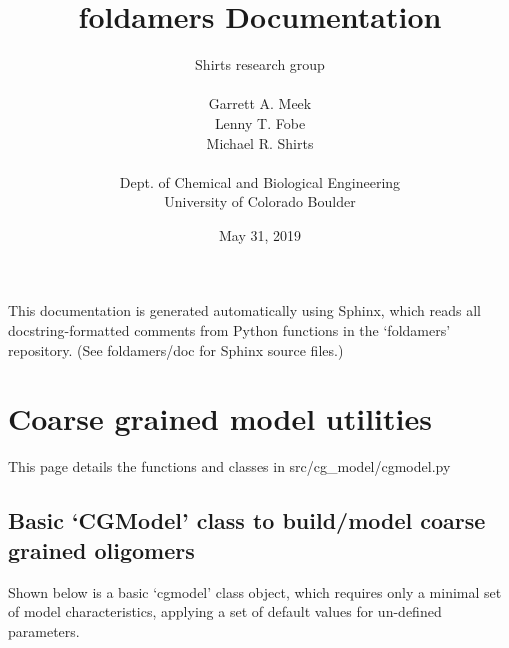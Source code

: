 \documentclass[letterpaper,12pt,english,openany,oneside]{sphinxmanual}
\title{foldamers Documentation}
\date{May 31, 2019}
\author{Shirts research group\\ \\Garrett A. Meek\\Lenny T. Fobe\\Michael R. Shirts\\ \\Dept. of Chemical and Biological Engineering\\University of Colorado Boulder}
\begin{document}
\pagestyle{empty}
\sphinxmaketitle
\pagestyle{plain}
\sphinxtableofcontents
\pagestyle{normal}
\label{\detokenize{index::doc}}


This documentation is generated automatically using Sphinx, which reads all docstring-formatted comments from Python functions in the ‘foldamers’ repository.  (See foldamers/doc for Sphinx source files.)


\chapter{Coarse grained model utilities}
\label{\detokenize{cg_model:coarse-grained-model-utilities}}\label{\detokenize{cg_model::doc}}
This page details the functions and classes in src/cg\_model/cgmodel.py


\section{Basic ‘CGModel’ class to build/model coarse grained oligomers}
\label{\detokenize{cg_model:basic-cgmodel-class-to-build-model-coarse-grained-oligomers}}
Shown below is a basic ‘cgmodel’ class object, which requires only a minimal set of model characteristics, applying a set of default values for un-defined parameters.

\label{\detokenize{cg_model:module-cg_model.cgmodel}}
\end{document}
